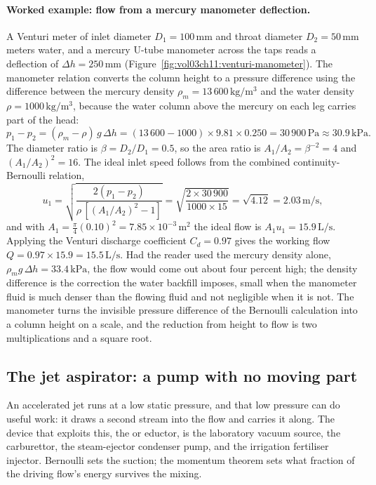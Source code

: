 

\paragraph{Worked example: flow from a mercury manometer deflection.} A
Venturi meter of inlet diameter $D_1 = 100\,\si{\milli\meter}$ and
throat diameter $D_2 = 50\,\si{\milli\meter}$ meters water, and a
mercury U-tube manometer across the taps reads a deflection of $\Delta
h = 250\,\si{\milli\meter}$ (Figure~\ref{fig:vol03ch11:venturi-manometer}).
The manometer relation converts the column height to a pressure
difference using the difference between the mercury density $\rho_m =
13\,600\,\si{\kilogram\per\meter\cubed}$ and the water density $\rho =
1000\,\si{\kilogram\per\meter\cubed}$, because the water column above
the mercury on each leg carries part of the head:
\[
p_1 - p_2 = (\rho_m - \rho)\,g\,\Delta h
= (13\,600 - 1000)\times 9.81\times 0.250
= 30\,900\,\text{Pa} \approx 30.9\,\text{kPa}.
\]
The diameter ratio is $\beta = D_2/D_1 = 0.5$, so the area ratio is
$A_1/A_2 = \beta^{-2} = 4$ and $(A_1/A_2)^2 = 16$. The ideal inlet
speed follows from the combined continuity-Bernoulli relation,
\[
u_1 = \sqrt{\frac{2(p_1 - p_2)}{\rho\,[(A_1/A_2)^2 - 1]}}
= \sqrt{\frac{2\times 30\,900}{1000\times 15}}
= \sqrt{4.12}
= 2.03\,\si{\meter\per\second},
\]
and with $A_1 = \tfrac{\pi}{4}(0.10)^2 = 7.85\times
10^{-3}\,\si{\meter}^2$ the ideal flow is $A_1 u_1 = 15.9\,\text{L/s}$.
Applying the Venturi discharge coefficient $C_d = 0.97$ gives the
working flow $Q = 0.97\times 15.9 = 15.5\,\text{L/s}$. Had the reader
used the mercury density alone, $\rho_m g\,\Delta h = 33.4\,\text{kPa}$,
the flow would come out about four percent high; the density difference
is the correction the water backfill imposes, small when the manometer
fluid is much denser than the flowing fluid and not negligible when it
is not. The manometer turns the invisible pressure difference of the
Bernoulli calculation into a column height on a scale, and the reduction
from height to flow is two multiplications and a square root.

\subsection{The jet aspirator: a pump with no moving part}

An accelerated jet runs at a low static pressure, and that low
pressure can do useful work: it draws a second stream into the flow
and carries it along. The device that exploits this, the
 or eductor, is the laboratory vacuum source, the
carburettor, the steam-ejector condenser pump, and the irrigation
fertiliser injector. Bernoulli sets the suction; the momentum theorem
sets what fraction of the driving flow's energy survives the mixing.

